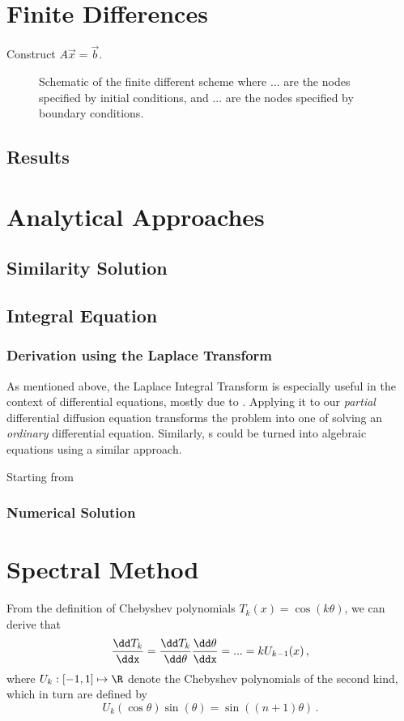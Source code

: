 \documentclass{prettytex/ox/mmsc-special-topic}
\begin{document}
  \section{Finite Differences}
  Construct $A \vec{x} = \vec{b}$.

  \begin{figure}[H]
    \centering
    \caption{Schematic of the finite different scheme where ... are the nodes specified by initial conditions, and ... are the nodes specified by boundary conditions.}
    \label{fig:fd-scheme}
  \end{figure}

  \subsection{Results}

  \section{Analytical Approaches}
  \subsection{Similarity Solution}
  \subsection{Integral Equation}
  \subsubsection{Derivation using the Laplace Transform}
  As mentioned above, the Laplace Integral Transform is especially useful in the context of differential equations, mostly due to .
  Applying it to our \textit{partial} differential diffusion equation  transforms the problem into one of solving an \textit{ordinary} differential equation.
  Similarly, s could be turned into algebraic equations using a similar approach.

  Starting from 

  \subsubsection{Numerical Solution}

  \section{Spectral Method}
  From the definition of Chebyshev polynomials $T_k(x) = \cos(k\theta)$, we can derive that
  $$\frac{\dd T_k}{\ddx} = \frac{\dd T_k}{\dd\theta} \frac{\dd\theta}{\ddx} = ... = k U_{k-1}(x)\,,$$
  where $U_k: [-1, 1] \mapsto \R$ denote the Chebyshev polynomials of the second kind, which in turn are defined by
  $$U_k(\cos \theta) \sin(\theta) = \sin\left((n+1) \theta\right)\,.$$
\end{document}
